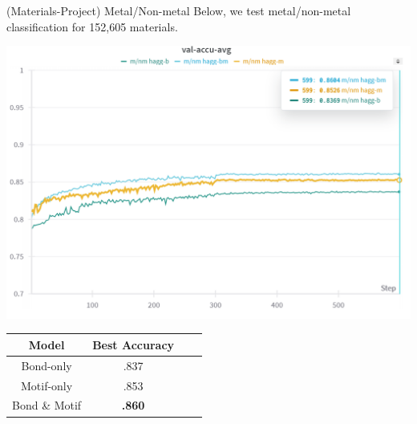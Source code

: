 \documentclass[11pt]{beamer}
\begin{document}
\begin{frame}{(Materials-Project) Metal/Non-metal}
Below, we test metal/non-metal classification for 152,605 materials.
\begin{center}
\includegraphics[scale=0.4]{metal_nonmetal.png}

\medskip



\begin{tabular}{c|ccc}
Model & Best Accuracy  \\
\hline
Bond-only & .837\\
Motif-only & .853\\
Bond \& Motif & \textbf{.860}\\
\end{tabular}
\end{center}
\end{frame}
\end{document}
